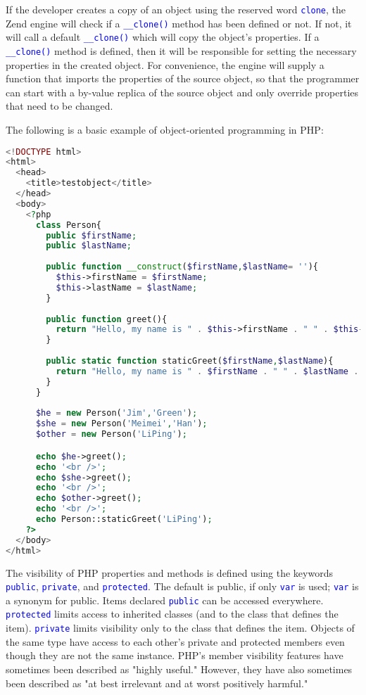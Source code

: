 If the developer creates a copy of an object using the reserved word \textcolor{Blue}{\texttt{clone}}, the Zend engine will check if a \textcolor{Blue}{\texttt{\_\_clone()}} method has been defined or not. If not, it will call a default \textcolor{Blue}{\texttt{\_\_clone()}} which will copy the object's properties. If a \textcolor{Blue}{\texttt{\_\_clone()}} method is defined, then it will be responsible for setting the necessary properties in the created object. For convenience, the engine will supply a function that imports the properties of the source object, so that the programmer can start with a by-value replica of the source object and only override properties that need to be changed.

The following is a basic example of object-oriented programming in PHP:

\begin{lstlisting}[language=PHP]
<!DOCTYPE html>
<html>
  <head>
    <title>testobject</title>
  </head>
  <body>
    <?php
      class Person{
        public $firstName;
        public $lastName;
        
        public function __construct($firstName,$lastName= ''){
          $this->firstName = $firstName;
          $this->lastName = $lastName;
        }
        
        public function greet(){
          return "Hello, my name is " . $this->firstName . " " . $this->lastName . ".";
        }
        
        public static function staticGreet($firstName,$lastName){
          return "Hello, my name is " . $firstName . " " . $lastName . "."; 
        }
      }
      
      $he = new Person('Jim','Green');
      $she = new Person('Meimei','Han');
      $other = new Person('LiPing');

      echo $he->greet();
      echo '<br />';
      echo $she->greet();
      echo '<br />';
      echo $other->greet();
      echo '<br />';
      echo Person::staticGreet('LiPing');
    ?>
  </body>
</html>
\end{lstlisting}

The visibility of PHP properties and methods is defined using the keywords \textcolor{Blue}{\texttt{public}}, \textcolor{Blue}{\texttt{private}}, and \textcolor{Blue}{\texttt{protected}}. The default is public, if only \textcolor{Blue}{\texttt{var}} is used; \textcolor{Blue}{\texttt{var}} is a synonym for public. Items declared \textcolor{Blue}{\texttt{public}} can be accessed everywhere. \textcolor{Blue}{\texttt{protected}} limits access to inherited classes (and to the class that defines the item). \textcolor{Blue}{\texttt{private}} limits visibility only to the class that defines the item. Objects of the same type have access to each other's private and protected members even though they are not the same instance. PHP's member visibility features have sometimes been described as "highly useful." However, they have also sometimes been described as "at best irrelevant and at worst positively harmful."

